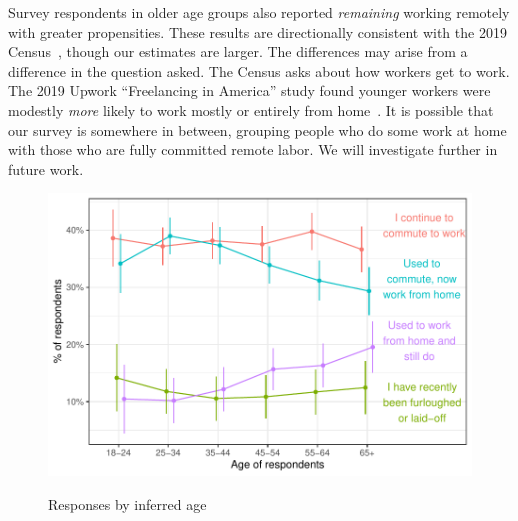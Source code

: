 \documentclass[12pt]{article}
\begin{document}
Survey respondents in older age groups also reported \emph{remaining} working remotely with greater propensities.
These results are directionally consistent with the 2019 Census~\cite{ACSTableB08101}, though our estimates are larger.
The differences may arise from a difference in the question asked.
The Census asks about how workers get to work. The 2019 Upwork ``Freelancing in America'' study found younger workers were modestly \emph{more} likely to work mostly or entirely from home~\cite{upwork2019}.
It is possible that our survey is somewhere in between, grouping people who do some work at home with those who are fully committed remote labor.
We will investigate further in future work.

\begin{figure}
  \caption{Responses by inferred age} \label{fig:by_age}
\centering
\begin{minipage}{1.0 \linewidth}
  \includegraphics[width = \linewidth]{plots/by_age.pdf} \\
  \begin{footnotesize}
    \begin{singlespace}
    \end{singlespace}
    \end{footnotesize}
\end{minipage}
\end{figure} 


\end{document}
